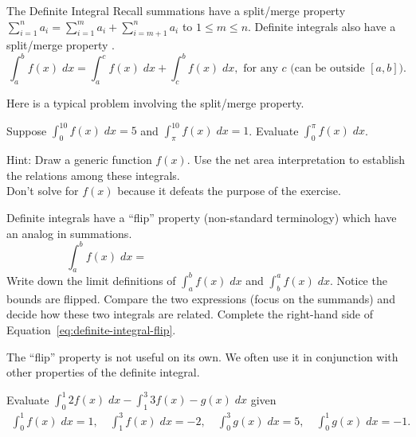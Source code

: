 \documentclass[../main.tex]{subfiles}
\begin{document}
\begin{lesson}{The Definite Integral}
  Recall summations have a split/merge property \(\sum_{i=1}^{n} a_{i} = \sum_{i=1}^{m} a_{i} + \sum_{i=m+1}^{n} a_{i}\)  to \(1 \le m \le n\).
  Definite integrals also have a split/merge property .
  \begin{equation} \label{eq:definite-integral-split}
    \int_{a}^{b} f(x) \;dx = \int_{a}^{c} f(x) \;dx + \int_{c}^{b} f(x) \;dx, \text{ for any } c \text{ (can be outside \([a,b]\)}).
  \end{equation}

  Here is a typical problem involving the split/merge property.
  \begin{example} \label{ex:definite-integral-split}
    Suppose \(\int_{0}^{10} f(x) \;dx = 5\) and \(\int_{\pi}^{10} f(x) \;dx = 1\).  Evaluate \(\int_{0}^{\pi} f(x) \;dx\).

    {\footnotesize Hint: Draw a generic function \(f(x)\). Use the net area interpretation to establish the relations among these integrals. \\Don't solve for \(f(x)\) because it defeats the purpose of the exercise.}
  \end{example}
  \vfill{}\clearpage

  Definite integrals have a ``flip'' property (non-standard terminology) which  have an analog in summations.
  \begin{equation} \label{eq:definite-integral-flip}
    \int_{a}^{b} f(x) \;dx = \hspace{3in}
  \end{equation}
  Write down the limit definitions of \(\int_{a}^{b} f(x) \;dx\) and \(\int_{b}^{a} f(x) \;dx\). Notice the bounds are flipped.
  Compare the two expressions (focus on the summands) and decide how these two integrals are related. Complete the right-hand side of Equation~\eqref{eq:definite-integral-flip}.

  The ``flip'' property is not useful on its own. We often use it in conjunction with other properties of the definite integral.
  \begin{example}
    Evaluate \(\int_{0}^{1} 2f(x) \;dx - \int_{1}^{3} 3f(x) - g(x)\;dx\) given 
    \begin{align*}
      \int_{0}^{1} f(x) \;dx = 1, \quad \int_{1}^{3} f(x) \;dx = -2, \quad \int_{0}^{3} g(x) \;dx = 5, \quad \int_{0}^{1} g(x) \;dx = -1.
    \end{align*}
    

\end{example}
\end{lesson}
\end{document}
